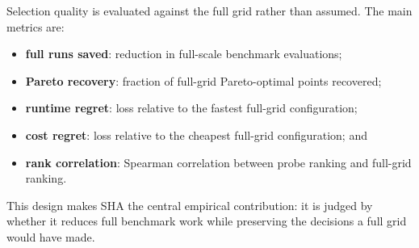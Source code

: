 Selection quality is evaluated against the full grid rather than assumed. The main metrics are:
\begin{itemize}
    \item \textbf{full runs saved}: reduction in full-scale benchmark evaluations;
    \item \textbf{Pareto recovery}: fraction of full-grid Pareto-optimal points recovered;
    \item \textbf{runtime regret}: loss relative to the fastest full-grid configuration;
    \item \textbf{cost regret}: loss relative to the cheapest full-grid configuration; and
    \item \textbf{rank correlation}: Spearman correlation between probe ranking and full-grid ranking.
\end{itemize}

This design makes SHA the central empirical contribution: it is judged by whether it reduces full benchmark work while preserving the decisions a full grid would have made.
